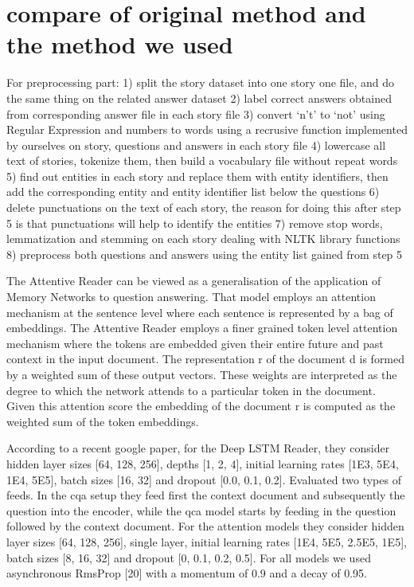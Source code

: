 \documentclass[runningheads,a4paper]{llncs}
\begin{document}
\section{compare of original method and the method we used}
For preprocessing part:
1) split the story dataset into one story one file, and do the same thing on the related answer dataset 
2) label correct answers obtained from corresponding answer file
in each story file 
3) convert ‘n’t’ to ‘not’ using Regular Expression and numbers to words using a recrusive function implemented by ourselves on story, questions and answers in each story file 
4) lowercase all text of stories, tokenize them, then build a vocabulary file without repeat words
5) find out entities in each story and replace them with entity identifiers, then add the corresponding entity and entity identifier list below the questions
6) delete punctuations on the text of each story, the reason for doing this after step 5 is that punctuations will help to identify the entities 
7) remove stop words, lemmatization and stemming on each story dealing with NLTK library functions
8) preprocess both questions and answers using the entity list gained from step 5

The Attentive Reader can be viewed as a generalisation of the application of Memory Networks to question answering. That model employs an attention mechanism at the sentence level where each sentence is represented by a bag of embeddings. The Attentive Reader employs a finer grained token level attention mechanism where the tokens are embedded given their entire future and past context in the input document. 
The representation r of the document d is formed by a weighted sum of these output vectors. These weights are interpreted as the degree to which the network attends to a particular token in the document. Given this attention score the embedding of the document r is computed as the weighted sum of the token embeddings. 

According to a recent google paper, for the Deep LSTM Reader, they consider hidden layer sizes [64, 128, 256], depths [1, 2, 4], initial learning rates [1E3, 5E4, 1E4, 5E5], batch sizes [16, 32] and dropout [0.0, 0.1, 0.2]. Evaluated two types of feeds. In the cqa setup they feed first the context document and subsequently the question into the encoder, while the qca model starts by feeding in the question followed by the context document. For the attention models they consider hidden layer sizes [64, 128, 256], single layer, initial learning rates [1E4, 5E5, 2.5E5, 1E5], batch sizes [8, 16, 32] and dropout [0, 0.1, 0.2, 0.5]. For all models we used asynchronous RmsProp [20] with a momentum of 0.9 and a decay of 0.95. 
\end{document}
